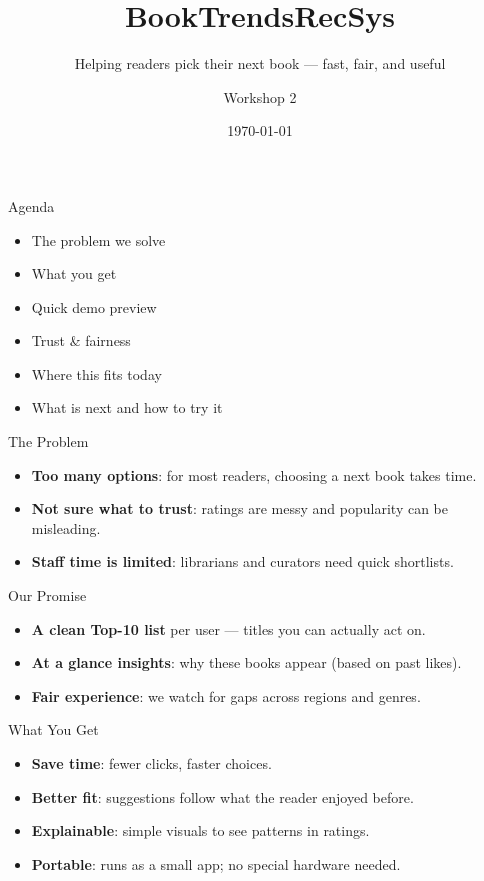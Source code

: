 \documentclass[aspectratio=169,11pt]{beamer}
\title{\textbf{BookTrendsRecSys}}
\subtitle{Helping readers pick their next book --- fast, fair, and useful}
\author{Workshop 2}
\institute{}
\date{\today}
\begin{document}
\begin{frame}
  \titlepage
\end{frame}

\begin{frame}{Agenda}
\begin{itemize}
  \item The problem we solve
  \item What you get
  \item Quick demo preview
  \item Trust \& fairness 
  \item Where this fits today
  \item What is next and how to try it
\end{itemize}
\end{frame}

\begin{frame}{The Problem}
\begin{itemize}
  \item \textbf{Too many options}: for most readers, choosing a next book takes time.
  \item \textbf{Not sure what to trust}: ratings are messy and popularity can be misleading.
  \item \textbf{Staff time is limited}: librarians and curators need quick shortlists.
\end{itemize}
\end{frame}

\begin{frame}{Our Promise}
\begin{itemize}
  \item \textbf{A clean Top-10 list} per user --- titles you can actually act on.
  \item \textbf{At a glance insights}: why these books appear (based on past likes).
  \item \textbf{Fair experience}: we watch for gaps across regions and genres.
\end{itemize}
\end{frame}

\begin{frame}{What You Get}
\begin{itemize}
  \item \textbf{Save time}: fewer clicks, faster choices.
  \item \textbf{Better fit}: suggestions follow what the reader enjoyed before.
  \item \textbf{Explainable}: simple visuals to see patterns in ratings.
  \item \textbf{Portable}: runs as a small app; no special hardware needed.
\end{itemize}
\end{frame}
\end{document}
